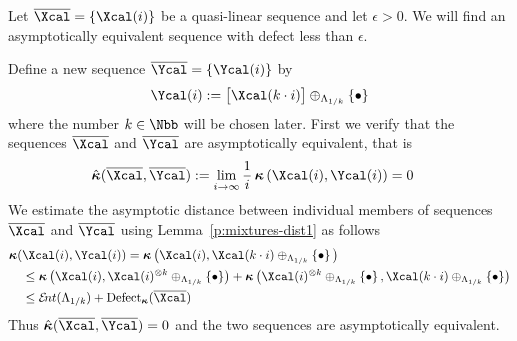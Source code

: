 \begin{Proof}
  Let $\bar\Xcal=\set{\Xcal(i)}$ be a quasi-linear sequence and let $\epsilon > 0$. We will
  find an asymptotically equivalent sequence with defect less than $\epsilon$.
  
  Define a
  new sequence $\bar\Ycal=\set{\Ycal(i)}$ by
  \[
  \Ycal(i)
  :=
  \big[\Xcal(k\cdot i)\big]
  \oplus_{\Lambda_{1/k}}
  \set{\bullet}
  \]
  where the number $k\in\Nbb$ will be chosen later.  First we verify
  that the sequences $\bar\Xcal$ and $\bar\Ycal$ are asymptotically
  equivalent, that is 
  \begin{align*}
    \hat\aikd(\bar\Xcal,\bar\Ycal)
    &:=
    \lim_{i\to\infty}
    \frac{1}{i}
    \aikd\left(\Xcal(i), 
               \Ycal(i)
         \right)
     =
     0
  \end{align*}
  We estimate the asymptotic distance between individual members of
  sequences $\bar\Xcal$ and $\bar\Ycal$ using
  Lemma~\ref{p:mixtures-dist1} as
  follows
  \begin{align*}
    \aikd(&\Xcal(i), 
               \Ycal(i)
         )
    =
    \aikd\big(\Xcal(i), 
               \Xcal(k\cdot i)
               \oplus_{\Lambda_{1/k}}\set{\bullet}
         \big)    
    \\
    &\leq
    \aikd\left(\Xcal(i), 
               \Xcal(i)^{\otimes k}
               \oplus_{\Lambda_{1/k}}\set{\bullet}
         \right)
    +    
    \aikd\left(\Xcal(i)^{\otimes k}
               \oplus_{\Lambda_{1/k}}\set{\bullet}, 
               \Xcal(k\cdot i)
               \oplus_{\Lambda_{1/k}}\set{\bullet}
         \right)    
    \\
    &\leq
    \ent(\Lambda_{1/k})
    +    
    \defect_{\aikd}(\bar\Xcal)   
  \end{align*}
  Thus $\hat\aikd(\bar\Xcal,\bar\Ycal)=0$ and the two sequences are
  asymptotically equivalent.
  

\end{Proof}

